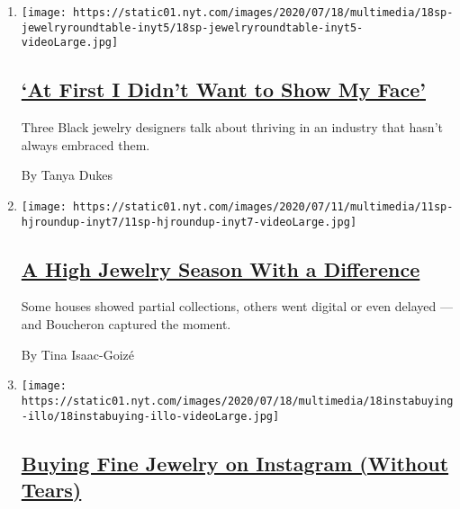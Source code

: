 \begin{enumerate}
\def\labelenumi{\arabic{enumi}.}
\item
  \texttt{[image: https://static01.nyt.com/images/2020/07/18/multimedia/18sp-jewelryroundtable-inyt5/18sp-jewelryroundtable-inyt5-videoLarge.jpg]}

  \hypertarget{at-first-i-didnt-want-to-show-my-face}{%
  \subsection{\texorpdfstring{\href{/2020/07/17/fashion/jewelry-black-designers.html}{`At
  First I Didn't Want to Show My
  Face'}}{`At First I Didn't Want to Show My Face'}}\label{at-first-i-didnt-want-to-show-my-face}}

  Three Black jewelry designers talk about thriving in an industry that
  hasn't always embraced them.

  By Tanya Dukes
\item
  \texttt{[image: https://static01.nyt.com/images/2020/07/11/multimedia/11sp-hjroundup-inyt7/11sp-hjroundup-inyt7-videoLarge.jpg]}

  \hypertarget{a-high-jewelry-season-with-a-difference}{%
  \subsection{\texorpdfstring{\href{/2020/07/10/fashion/jewelry-couture-boucheron-van-cleef-and-arpels.html}{A
  High Jewelry Season With a
  Difference}}{A High Jewelry Season With a Difference}}\label{a-high-jewelry-season-with-a-difference}}

  Some houses showed partial collections, others went digital or even
  delayed --- and Boucheron captured the moment.

  By Tina Isaac-Goizé
\item
  \texttt{[image: https://static01.nyt.com/images/2020/07/18/multimedia/18instabuying-illo/18instabuying-illo-videoLarge.jpg]}

  \hypertarget{buying-fine-jewelry-on-instagram-without-tears}{%
  \subsection{\texorpdfstring{\href{/2020/07/17/fashion/jewelry-instagram-buying-online.html}{Buying
  Fine Jewelry on Instagram (Without
  Tears)}}{Buying Fine Jewelry on Instagram (Without Tears)}}\label{buying-fine-jewelry-on-instagram-without-tears}}


\end{enumerate}
